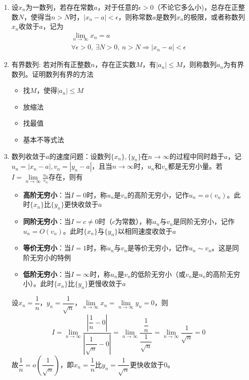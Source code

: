 \documentclass[a4paper,12pt]{article}
\begin{document}
    \begin{enumerate}
        \item 设${x_n}$为一数列，若存在常数$a$，对于任意的$\epsilon > 0$（不论它多么小)，总存在正整数$N$，使得当$n > N$时，$|x_n - a| < \epsilon$，则称常数$a$是数列${x_n}$的极限，或者称数列${x_n}$收敛于$a$，记为
        \begin{gather*}
            \lim_{n \to \infty} x_n = a \\
            \forall \epsilon > 0,\ \exists N > 0,\ n > N \Rightarrow |x_n - a| < \epsilon
        \end{gather*}
        \item 有界数列: 若对所有正整数$n$，存在正实数$M$，有$|a_n| \leq M$，则称数列${a_n}$为有界数列。证明数列有界的方法
        \begin{itemize}
            \item 找$M$，使得$|a_n| \leq M$
            \item 放缩法
            \item 找最值
            \item 基本不等式法
        \end{itemize}
        \item 数列收敛于$a$的速度问题：设数列$\{x_n\}, \{y_n\}$在$n\to \infty$的过程中同时趋于$a$，记$u_n = |x_n - a|, v_n = |y_n - a|$，且当$n\to \infty$时，$u_n$和$v_n$都是无穷小量。若$I = \lim\limits_{n\to\infty} \displaystyle\frac{u_n}{v_n}$存在，则有

        \begin{itemize}
            \item \textbf{高阶无穷小}：当$I = 0$时，称$u_n$是$v_n$的高阶无穷小，记作$u_n = o(v_n)$。此时$\{x_n\}$比$\{y_n\}$更快收敛于$a$
            \item \textbf{同阶无穷小}：当$I = c \neq 0$时（$c$为常数），称$u_n$与$v_n$是同阶无穷小，记作$u_n = O(v_n)$。此时$\{x_n\}$与$\{y_n\}$以相同速度收敛于$a$
            \item \textbf{等价无穷小}：当$I = 1$时，称$u_n$与$v_n$是等价无穷小，记作$u_n \sim v_n$。这是同阶无穷小的特例
            \item \textbf{低阶无穷小}：当$I = \infty$时，称$u_n$是$v_n$的低阶无穷小（或$v_n$是$u_n$的高阶无穷小）。此时$\{x_n\}$比$\{y_n\}$更慢收敛于$a$
        \end{itemize}

        \begin{analysisbox}[示例]
            设$x_n = \dfrac{1}{n}$，$y_n = \dfrac{1}{\sqrt{n}}$，$\lim\limits_{n\to \infty} x_n = \lim\limits_{n\to \infty} y_n = 0$，则
            \[
                I = \lim\limits_{n\to\infty} \dfrac{\left|\dfrac{1}{n} - 0\right|}{\left|\dfrac{1}{\sqrt{n}} - 0\right|}
                = \lim\limits_{n\to\infty} \dfrac{\dfrac{1}{n}}{\dfrac{1}{\sqrt{n}}}
                = \lim\limits_{n\to\infty} \dfrac{1}{\sqrt{n}}
                = 0
            \]
            故$\dfrac{1}{n} = o\!\left(\dfrac{1}{\sqrt{n}}\right)$，即$x_n = \dfrac{1}{n}$比$y_n = \dfrac{1}{\sqrt{n}}$更快收敛于$0$。
        \end{analysisbox}
    \end{enumerate}
\end{document}
